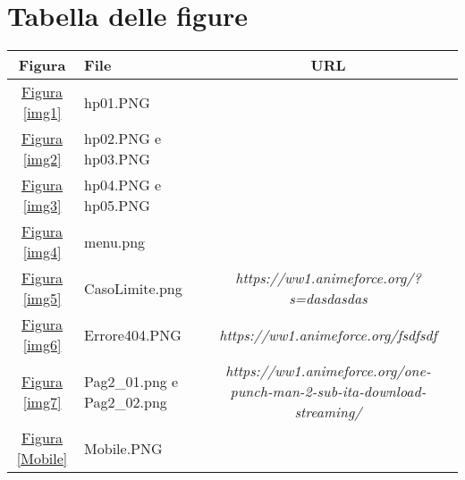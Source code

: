 \section{Tabella delle figure}

\begin{center}
	\begin{tabularx}{\textwidth}{|c|X|c|}
		\hline
		\textbf{Figura} & \textbf{File} &\textbf{URL} \\ \hline
		\hyperref[img1]{Figura \ref{img1}} & hp01.PNG 					& \linkSito \\ \hline
		\hyperref[img2]{Figura \ref{img2}} & hp02.PNG e hp03.PNG 	& \linkSito \\ \hline
		\hyperref[img3]{Figura \ref{img3}} & hp04.PNG e hp05.PNG 	& \linkSito \\ \hline
		\hyperref[img4]{Figura \ref{img4}} & menu.png 		& \linkSito \\ \hline
		\hyperref[img5]{Figura \ref{img5}} & CasoLimite.png	& \textit{https://ww1.animeforce.org/?s=dasdasdas} \\ \hline
		
		\hyperref[img6]{Figura \ref{img6}} & Errore404.PNG  & \textit{https://ww1.animeforce.org/fsdfsdf}\\ \hline
		
		
		\hyperref[img7]{Figura \ref{img7}} & Pag2\_01.png e Pag2\_02.png & \textit{https://ww1.animeforce.org/one-punch-man-2-sub-ita-download-streaming/} \\ \hline
		 
	 
		\hyperref[Mobile]{Figura \ref{Mobile}} & Mobile.PNG & \linkSito \\ \hline
	
	\end{tabularx}
	
\end{center}